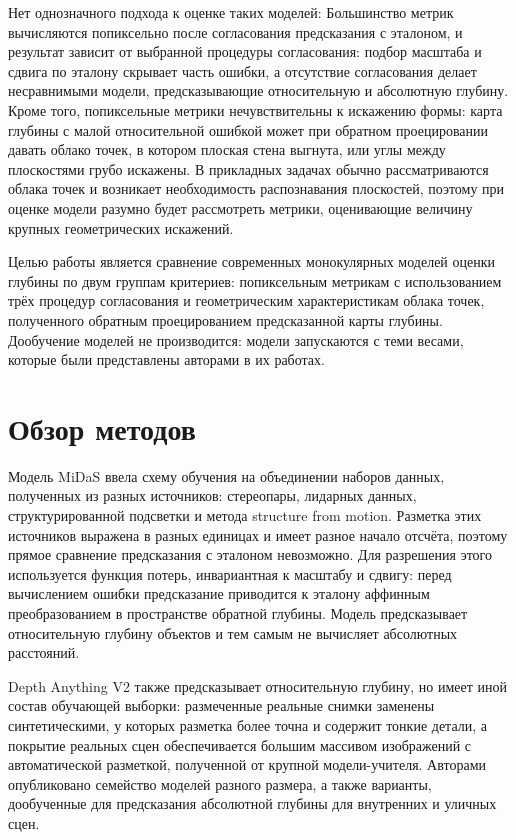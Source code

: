 \documentclass{misisarticle}
\begin{document}
Нет однозначного подхода к оценке таких моделей: Большинство метрик вычисляются попиксельно после согласования предсказания с эталоном, и результат зависит от выбранной процедуры согласования: подбор масштаба и сдвига по эталону скрывает часть ошибки, а отсутствие согласования делает несравнимыми модели, предсказывающие относительную и абсолютную глубину. Кроме того, попиксельные метрики нечувствительны к искажению формы: карта глубины с малой относительной ошибкой может при обратном проецировании давать облако точек, в котором плоская стена выгнута, или углы между плоскостями грубо искажены. В прикладных задачах обычно рассматриваются облака точек и возникает необходимость распознавания плоскостей, поэтому при оценке модели разумно будет рассмотреть метрики, оценивающие величину крупных геометрических искажений.

Целью работы является сравнение современных монокулярных моделей оценки глубины по двум группам критериев: попиксельным метрикам с использованием трёх процедур согласования и геометрическим характеристикам облака точек, полученного обратным проецированием предсказанной карты глубины. Дообучение моделей не производится: модели запускаются с теми весами, которые были представлены авторами в их работах.

\section{Обзор методов}

Модель MiDaS \cite{pub1} ввела схему обучения на объединении наборов данных, полученных из разных источников: стереопары, лидарных данных, структурированной подсветки и метода structure from motion. Разметка этих источников выражена в разных единицах и имеет разное начало отсчёта, поэтому прямое сравнение предсказания с эталоном невозможно. Для разрешения этого используется функция потерь, инвариантная к масштабу и сдвигу: перед вычислением ошибки предсказание приводится к эталону аффинным преобразованием в пространстве обратной глубины. Модель предсказывает относительную глубину объектов и тем самым не вычисляет абсолютных расстояний.

Depth Anything V2 \cite{pub2} также предсказывает относительную глубину, но имеет иной состав обучающей выборки: размеченные реальные снимки заменены синтетическими, у которых разметка более точна и содержит тонкие детали, а покрытие реальных сцен обеспечивается большим массивом изображений с автоматической разметкой, полученной от крупной модели-учителя. Авторами опубликовано семейство моделей разного размера, а также варианты, дообученные для предсказания абсолютной глубины для внутренних и уличных сцен.
\end{document}
